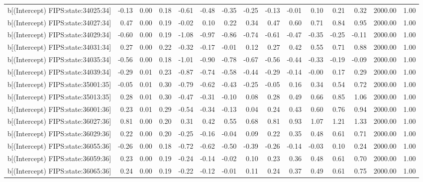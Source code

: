 \begin{table}[ht]
\begin{tabular}{rrrrrrrrrrrrrrr}
  b[(Intercept) FIPS:state:34025:34] & -0.13 & 0.00 & 0.18 & -0.61 & -0.48 & -0.35 & -0.25 & -0.13 & -0.01 & 0.10 & 0.21 & 0.32 & 2000.00 & 1.00 \\ 
  b[(Intercept) FIPS:state:34027:34] & 0.47 & 0.00 & 0.19 & -0.02 & 0.10 & 0.22 & 0.34 & 0.47 & 0.60 & 0.71 & 0.84 & 0.95 & 2000.00 & 1.00 \\ 
  b[(Intercept) FIPS:state:34029:34] & -0.60 & 0.00 & 0.19 & -1.08 & -0.97 & -0.86 & -0.74 & -0.61 & -0.47 & -0.35 & -0.25 & -0.11 & 2000.00 & 1.00 \\ 
  b[(Intercept) FIPS:state:34031:34] & 0.27 & 0.00 & 0.22 & -0.32 & -0.17 & -0.01 & 0.12 & 0.27 & 0.42 & 0.55 & 0.71 & 0.88 & 2000.00 & 1.00 \\ 
  b[(Intercept) FIPS:state:34035:34] & -0.56 & 0.00 & 0.18 & -1.01 & -0.90 & -0.78 & -0.67 & -0.56 & -0.44 & -0.33 & -0.19 & -0.09 & 2000.00 & 1.00 \\ 
  b[(Intercept) FIPS:state:34039:34] & -0.29 & 0.01 & 0.23 & -0.87 & -0.74 & -0.58 & -0.44 & -0.29 & -0.14 & -0.00 & 0.17 & 0.29 & 2000.00 & 1.00 \\ 
  b[(Intercept) FIPS:state:35001:35] & -0.05 & 0.01 & 0.30 & -0.79 & -0.62 & -0.43 & -0.25 & -0.05 & 0.16 & 0.34 & 0.54 & 0.72 & 2000.00 & 1.00 \\ 
  b[(Intercept) FIPS:state:35013:35] & 0.28 & 0.01 & 0.30 & -0.47 & -0.31 & -0.10 & 0.08 & 0.28 & 0.49 & 0.66 & 0.85 & 1.06 & 2000.00 & 1.00 \\ 
  b[(Intercept) FIPS:state:36001:36] & 0.23 & 0.01 & 0.29 & -0.54 & -0.34 & -0.13 & 0.04 & 0.24 & 0.43 & 0.60 & 0.76 & 0.94 & 2000.00 & 1.00 \\ 
  b[(Intercept) FIPS:state:36027:36] & 0.81 & 0.00 & 0.20 & 0.31 & 0.42 & 0.55 & 0.68 & 0.81 & 0.93 & 1.07 & 1.21 & 1.33 & 2000.00 & 1.00 \\ 
  b[(Intercept) FIPS:state:36029:36] & 0.22 & 0.00 & 0.20 & -0.25 & -0.16 & -0.04 & 0.09 & 0.22 & 0.35 & 0.48 & 0.61 & 0.71 & 2000.00 & 1.00 \\ 
  b[(Intercept) FIPS:state:36055:36] & -0.26 & 0.00 & 0.18 & -0.72 & -0.62 & -0.50 & -0.39 & -0.26 & -0.14 & -0.03 & 0.10 & 0.24 & 2000.00 & 1.00 \\ 
  b[(Intercept) FIPS:state:36059:36] & 0.23 & 0.00 & 0.19 & -0.24 & -0.14 & -0.02 & 0.10 & 0.23 & 0.36 & 0.48 & 0.61 & 0.70 & 2000.00 & 1.00 \\ 
  b[(Intercept) FIPS:state:36065:36] & 0.24 & 0.00 & 0.19 & -0.22 & -0.12 & -0.01 & 0.11 & 0.24 & 0.37 & 0.49 & 0.61 & 0.75 & 2000.00 & 1.00 \\ 

\end{tabular}
\end{table}
